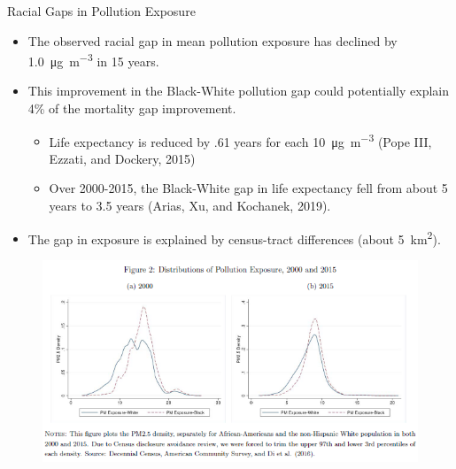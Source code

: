 \documentclass[dvipdfmx,12pt]{beamer}
\begin{document}
\begin{frame}{Racial Gaps in Pollution Exposure}
  \begin{itemize}
    \item The observed racial gap in mean pollution exposure has declined by \SI[per-mode=symbol]{1.0}{\micro \gram \per \cubic \meter}  in 15 years.
    \item This improvement in the Black-White pollution gap could potentially explain 4\% of the mortality gap improvement.
    \begin{itemize}
      \item Life expectancy is reduced by .61 years for each \SI[per-mode=symbol]{10}{\micro \gram \per \cubic \meter} (Pope III, Ezzati, and Dockery, 2015)
      \item Over 2000-2015, the Black-White gap in life expectancy fell from about 5 years to 3.5 years (Arias, Xu, and Kochanek, 2019).
    \end{itemize}
    \item The gap in exposure is explained by census-tract differences (about \SI{5}{\square \kilo \meter}).
  \end{itemize}
\end{frame}

\begin{frame}{}
  \begin{figure}
    \centering
    \includegraphics[scale = .7]{F2.png}
  \end{figure}
\end{frame}
\end{document}

